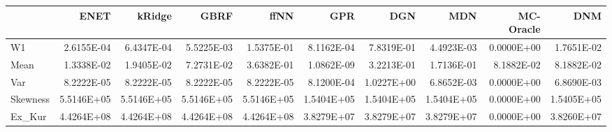 \begin{tabular}{lrrrrrrrrr}
\toprule
{} &       ENET &     kRidge &       GBRF &       ffNN &        GPR &        DGN &        MDN &  MC-Oracle &        DNM \\
\midrule
W1       & 2.6155E-04 & 6.4347E-04 & 5.5225E-03 & 1.5375E-01 & 8.1162E-04 & 7.8319E-01 & 4.4923E-03 & 0.0000E+00 & 1.7651E-02 \\
Mean     & 1.3338E-02 & 1.9405E-02 & 7.2731E-02 & 3.6382E-01 & 1.0862E-09 & 3.2213E-01 & 1.7136E-01 & 8.1882E-02 & 8.1882E-02 \\
Var      & 8.2222E-05 & 8.2222E-05 & 8.2222E-05 & 8.2222E-05 & 8.1200E-04 & 1.0227E+00 & 6.8652E-03 & 0.0000E+00 & 6.8690E-03 \\
Skewness & 5.5146E+05 & 5.5146E+05 & 5.5146E+05 & 5.5146E+05 & 1.5404E+05 & 1.5404E+05 & 1.5404E+05 & 0.0000E+00 & 1.5405E+05 \\
Ex\_Kur   & 4.4264E+08 & 4.4264E+08 & 4.4264E+08 & 4.4264E+08 & 3.8279E+07 & 3.8279E+07 & 3.8279E+07 & 0.0000E+00 & 3.8260E+07 \\
\bottomrule
\end{tabular}
